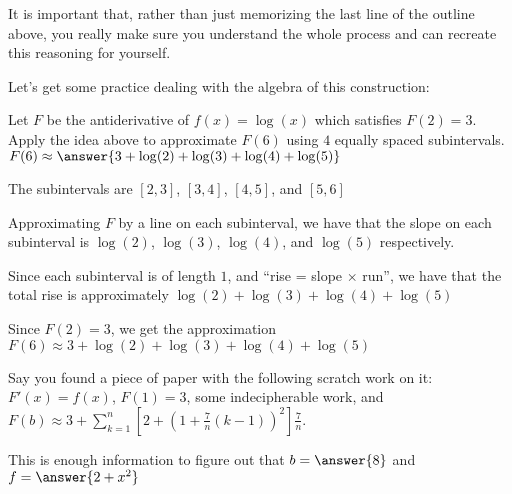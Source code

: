 \documentclass{ximera}
\begin{document}
	It is important that, rather than just memorizing the last line of the outline above, you really make sure you understand the whole process and can recreate this reasoning for yourself.  
	
	Let's get some practice dealing with the algebra of this construction:
	
	\begin{question}
		Let $F$ be the antiderivative of $f(x) = \log(x)$ which satisfies $F(2) = 3$.  Apply the idea above to approximate $F(6)$ using $4$ equally spaced subintervals.  $F(6) \approx \answer{3+ \log(2) + \log(3) + \log(4) + \log(5)}$
		\begin{hint}
			The subintervals are $[2,3]$, $[3,4]$, $[4,5]$, and $[5,6]$
		\end{hint}
		\begin{hint}
			Approximating $F$ by a line on each subinterval, we have that the slope on each subinterval is $\log(2)$, $\log(3)$, $\log(4)$,  and $\log(5)$ respectively.
		\end{hint}
		\begin{hint}
			Since each subinterval is of length $1$, and ``rise = slope $\times$ run'', we have that the total rise is approximately $\log(2) + \log(3) + \log(4) + \log(5)$ 
		\end{hint}
		\begin{hint}
			Since $F(2) = 3$, we get the approximation $F(6) \approx 3+ \log(2) + \log(3) + \log(4) + \log(5)$
		\end{hint}
	\end{question}
	
	\begin{question}
		Say you found a piece of paper with the following scratch work on it: $F'(x) =f(x)$,  $F(1) = 3$, some indecipherable work, and $F(b) \approx 3 + \sum_{k=1}^{n} \left[2+ ( 1+ \frac{7}{n}(k-1))^2 \right ] \frac{7}{n}$.
		
		This is enough information to figure out that $b = \answer{8}$   and $f = \answer{2+x^2}$
	\end{question}
\end{document}

